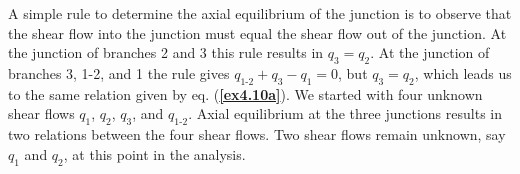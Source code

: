\documentclass{AeroStructure-ERJohnson}
\begin{document}
\begin{example*}
\vspace*{-3\baselineskip}
{\def\thefigure{4.36}
}
\vspace*{-1\baselineskip}

\noindent A simple rule to determine the axial equilibrium of the junction is to observe that the shear flow into the junction must equal the shear flow out of the junction. At the junction of branches 2 and 3 this rule results in $q_{3}=q_{2}$. At the junction of branches 3, 1-2, and 1 the rule gives $q_{\textrm{1-2}}+q_{3}-q_{1}=0$, but $q_{3}=q_{2}$, which leads us to the same relation given by eq. (\textbf{\ref{ex4.10a}}). We started with four unknown shear flows $q_1$, $q_2$, $q_3$, and $q_{\textrm{1-2}}$. Axial equilibrium at the three junctions results in two relations between the four shear flows. Two shear flows remain unknown, say $q_1$ and  $q_2$, at this point in the analysis.


\end{example*}
\end{document}
